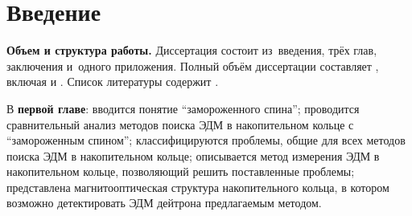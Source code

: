 \chapter*{Введение}                         %

\newcommand{\actuality}{}
\newcommand{\progress}{}
\newcommand{\aim}{{\textbf\aimTXT}}
\newcommand{\tasks}{\textbf{\tasksTXT}}
\newcommand{\novelty}{\textbf{\noveltyTXT}}
\newcommand{\influence}{\textbf{\influenceTXT}}
\newcommand{\methods}{\textbf{\methodsTXT}}
\newcommand{\defpositions}{\textbf{\defpositionsTXT}}
\newcommand{\reliability}{\textbf{\reliabilityTXT}}
\newcommand{\probation}{\textbf{\probationTXT}}
\newcommand{\contribution}{\textbf{\contributionTXT}}
\newcommand{\publications}{\textbf{\publicationsTXT}}


\textbf{Объем и структура работы.} Диссертация состоит из~введения, трёх глав,
заключения и~одного приложения.
%
Полный объём диссертации составляет
, включая
 и
.   Список литературы содержит
.

В \textbf{первой главе}: вводится понятие ``замороженного спина''; проводится сравнительный анализ методов поиска ЭДМ в накопительном кольце с ``замороженным спином''; классифицируются проблемы, общие для всех методов поиска ЭДМ в накопительном кольце; описывается метод измерения ЭДМ в накопительном кольце, позволяющий решить поставленные проблемы; представлена магнитооптическая структура накопительного кольца, в котором возможно детектировать ЭДМ дейтрона предлагаемым методом.

